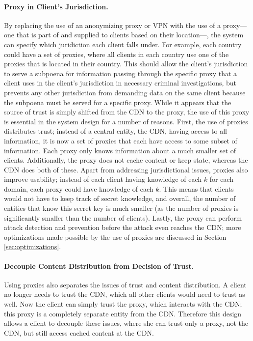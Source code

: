 \paragraph{Proxy in Client's Jurisdiction.} By replacing the use of an anonymizing proxy or VPN with the use 
of a proxy---one that is part of \system{} and supplied to clients based on their location---, the system can specify which juridiction each client falls under.  For example, 
each country could have a set of proxies, where all clients in each country use one of the proxies that 
is located in their country.  This should allow the client's jurisdiction to serve a subpoena for information 
passing through the specific proxy that a client uses in the client's jurisdiction in 
necessary criminal investigations, but prevents any other jurisdiction from demanding data on the same 
client because the subpoena must be served for a specific proxy.  While it appears that the source of 
trust is simply shifted from the CDN to the proxy, the use of this proxy is essential in 
the system design for a number of reasons.  First, the use of proxies distributes trust; instead of a 
central entity, the CDN, having access to all information, it is now a set of proxies that each have 
access to some subset of information.  Each proxy only knows information about a much smaller set of clients.  
Additionally, the proxy does not cache content or keep state, whereas the CDN does both of these.  Apart 
from addressing jurisdictional issues, proxies also improve usability; instead of each client having knowledge 
of each $k$ for each domain, each proxy could have knowledge of each $k$.  This means that clients would 
not have to keep track of secret knowledge, and overall, the number of entities that know this secret key 
is much smaller (as the number of proxies is significantly smaller than the number of clients).  Lastly, 
the proxy can perform attack detection and prevention before the attack even reaches the CDN; more optimizations 
made possible by the use of proxies are discussed in Section \ref{sec:optimizations}.

\paragraph{Decouple Content Distribution from Decision of Trust.} Using proxies also separates the issues of 
trust and content distribution.  A client no longer needs to trust the CDN, which all other clients would 
need to trust as well.  Now the client can simply trust the proxy, which interacts with the CDN; this proxy 
is a completely separate entity from the CDN.  Therefore this design allows a client to decouple these 
issues, where she can trust only a proxy, not the CDN, but still access cached content at the CDN.

